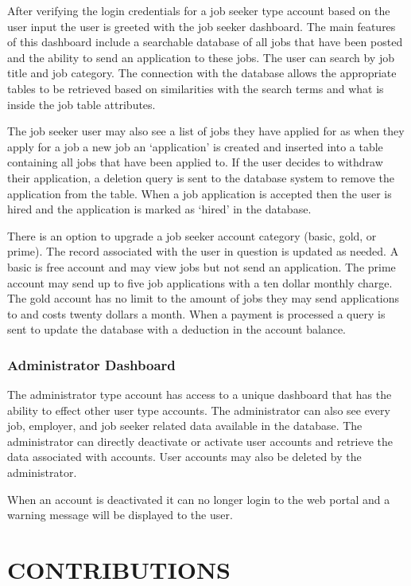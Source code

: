 \documentclass[11pt]{article}
\begin{document}
After verifying the login credentials for a job seeker type account based on the user input the user is greeted with the job seeker dashboard. The main features of this dashboard include a searchable database of all jobs that have been posted and the ability to send an application to these jobs. The user can search by job title and job category. The connection with the database allows the appropriate tables to be retrieved based on similarities with the search terms and what is inside the job table attributes. \par 
The job seeker user may also see a list of jobs they have applied for as when they apply for a job a new job an `application' is created and inserted into a table containing all jobs that have been applied to. If the user decides to withdraw their application, a deletion query is sent to the database system to remove the application from the table. When a job application is accepted then the user is hired and the application is marked as `hired' in the database. \par 
There is an option to upgrade a job seeker account category (basic, gold, or prime). The record associated with the user in question is updated as needed. A basic is free account and may view jobs but not send an application. The prime account may send up to five job applications with a ten dollar monthly charge. The gold account has no limit to the amount of jobs they may send applications to and costs twenty dollars a month. When a payment is processed a query is sent to update the database with a deduction in the account balance.

\subsubsection{Administrator Dashboard}

The administrator type account has access to a unique dashboard that has the ability to effect other user type accounts. The administrator can also see every job, employer, and job seeker related data available in the database. The administrator can directly deactivate or activate user accounts and retrieve the data associated with accounts. User accounts may also be deleted by the administrator. \par
	When an account is deactivated it can no longer login to the web portal and a warning message will be displayed to the user.

\newpage 

\section{CONTRIBUTIONS}
\end{document}
